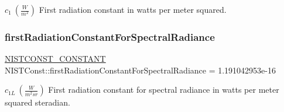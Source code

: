 $c_1 \ (\frac{W}{m^2})$ First radiation constant in watts per meter squared. \mbox{\label{group___n_i_s_t_const-_first_radiation_constant_ga350d484e55bd7af5e00f59d5ed64d43b}} 
\subsubsection{\texorpdfstring{first\+Radiation\+Constant\+For\+Spectral\+Radiance}{firstRadiationConstantForSpectralRadiance}}
{\footnotesize\ttfamily \mbox{\hyperlink{_n_i_s_t_const_8hpp_a2b0fc1d7452373f816175dd86ce26729}{N\+I\+S\+T\+C\+O\+N\+S\+T\+\_\+\+C\+O\+N\+S\+T\+A\+NT}} N\+I\+S\+T\+Const\+::first\+Radiation\+Constant\+For\+Spectral\+Radiance = 1.\+191042953e-\/16}

$c_{1L} \ (\frac{W}{m^2 sr})$ First radiation constant for spectral radiance in watts per meter squared steradian. 